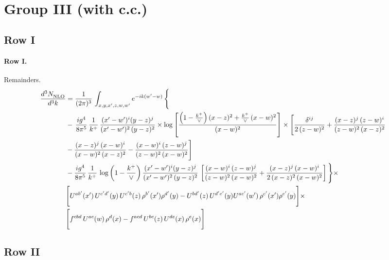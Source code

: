 \documentclass[10pt]{article}
\numberwithin{equation}{section}
\begin{document}
\section{Group III (with c.c.)}\label{sec:RgIII}
\subsection{Row I}
\paragraph{Row I.}
Remainders.
\begin{align}
     \frac{d^{3}N_{\rm NLO}^{\rm}}{d^{3}k}  & =   \frac{1}{(2\pi)^{3}}\, \int_{x,y,x',z,w,w^{\prime}} e^{-ik(w^{\prime}-w)}\, \Bigg\{\notag \\
& -\,\frac{ig^{4}}{8\pi^{5}}\,\frac{1}{k^{+}}\,\frac{(x'-w')^{i}(y-z)^{j}}{(x'-w')^{2}\,(y-z)^{2}}\times \log{\left[\frac{\left(1-\frac{k^{+}}{\vee}\right)(x-z)^{2}+\frac{k^{+}}{\vee}\,(x-w)^{2}}{(x-w)^{2}}\right]}\times \Bigg[\frac{\delta^{ij}}{2\,(z-w)^{2}}+\frac{(x-z)^{j}\,(z-w)^{i}}{(z-w)^{2}\,(x-z)^{2}}\notag \\ & -\frac{(x-z)^{j}\,(x-w)^{i}}{(x-w)^{2}\,(x-z)^{2}}-\frac{(x-w)^{i}\,(z-w)^{j}}{(z-w)^{2}\,(x-w)^{2}}\Bigg] \notag \\
&  -\frac{ig^{4}}{8\pi^{5}}\,\frac{1}{k^{+}}\,\log{\left(1-\frac{k^{+}}{\vee}\right)}\,\frac{(x'-w')^{i}(y-z)^{j}}{(x'-w')^{2}\,(y-z)^{2}}\,\left[\frac{(x-w)^{i}\,(z-w)^{j}}{(z-w)^{2}\,(x-w)^{2}}+\frac{(x-z)^{j}\,(x-w)^{i}}{2\,(x-z)^{2}\, (x-w)^{2}}\right]\Bigg\}\times \notag \\ &  \Bigg[U^{ab'}(x')\,U^{c'd'}(y)\,U^{c'b}(z)\,\rho^{b'}(x')\rho^{d'}(y)-U^{bd'}(z)\,U^{d'e'}(y)U^{ac'}(w')\,\rho^{c'}(x')\rho^{e'}(y)\Bigg]\times\notag \\ & \Bigg[f^{cbd}\,U^{ac}(w)\,\rho^{d}(x)-f^{acd}\, U^{bc}(z)\,U^{de}(x)\,\rho^{e}(x)\Bigg] \label{eq:R:G3I}
\end{align}

\subsection{Row II}
\end{document}
